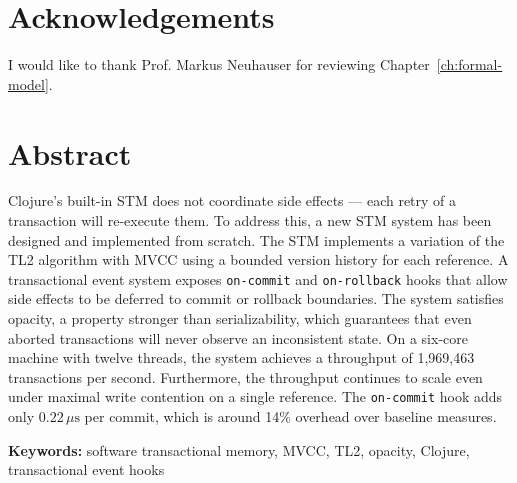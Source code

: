 \documentclass[12pt, oneside]{report}
\begin{document}
\chapter*{Acknowledgements}

I would like to thank Prof. Markus Neuhauser for reviewing Chapter~\ref{ch:formal-model}.

\chapter*{Abstract}

Clojure's built-in STM does not coordinate side effects --- each retry
of a transaction will re-execute them. To address this, a new STM system has been
designed and implemented from scratch. The STM implements a variation of the TL2
algorithm with MVCC using a bounded version history for each reference. A transactional
event system exposes \texttt{on-commit} and \texttt{on-rollback} hooks that allow side effects
to be deferred to commit or rollback boundaries. The system satisfies opacity, a
property stronger than serializability, which guarantees that even aborted
transactions will never observe an inconsistent state. On a six-core machine with
twelve threads, the system achieves a throughput of 1,969,463 transactions per second.
Furthermore, the throughput continues to scale even under maximal write
contention on a single reference. The \texttt{on-commit} hook adds only $0.22\,\mu\text{s}$ per commit,
which is around 14\% overhead over baseline measures.

\bigskip
\noindent\textbf{Keywords:} software transactional memory, MVCC, TL2, opacity, Clojure, transactional event hooks

\tableofcontents
\listoffigures
\listoftables
\listoflistings

\clearpage
{}










\end{document}

